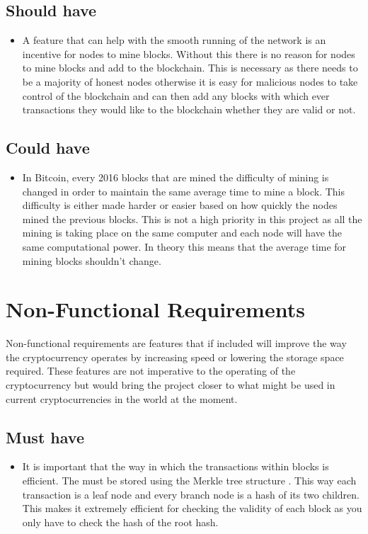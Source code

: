 \documentclass{l4proj}
\begin{document}
\subsection{Should have}
\begin{itemize}
    \item A feature that can help with the smooth running of the network is an incentive for nodes to mine blocks. Without this there
    is no reason for nodes to mine blocks and add to the blockchain. This is necessary as there needs to be a majority of 
    honest nodes otherwise it is easy for malicious nodes to take control of the blockchain and can then add any blocks with
    which ever transactions they would like to the blockchain whether they are valid or not.
\end{itemize}


\subsection{Could have}
\begin{itemize}
    \item In Bitcoin, every 2016 blocks that are mined the difficulty of mining is changed in order to maintain the same average time
    to mine a block. This difficulty is either made harder or easier based on how quickly the nodes mined the previous blocks.
    This is not a high priority in this project as all the mining is taking place on the same computer and each node will have
    the same computational power. In theory this means that the average time for mining blocks shouldn't change.
\end{itemize}


\section{Non-Functional Requirements}
Non-functional requirements are features that if included will improve the way the cryptocurrency operates by increasing
speed or lowering the storage space required. These features are not imperative to the operating of the cryptocurrency
but would bring the project closer to what might be used in current cryptocurrencies in the world at the moment.

\subsection{Must have}
\begin{itemize}
    \item It is important that the way in which the transactions within blocks is efficient. The must be stored using the Merkle
    tree structure \citep{merkle1987digital}. This way each transaction is a leaf node and every branch node is a hash of its two children.
    This makes it extremely efficient for checking the validity of each block as you only have to check the hash of the root
    hash.
\end{itemize}
\end{document}

